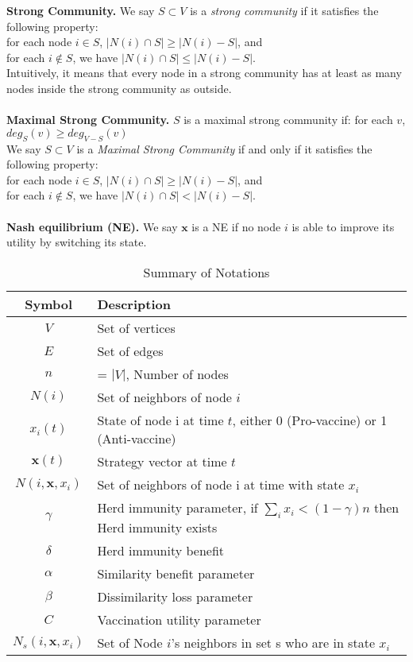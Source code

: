 \noindent
\textbf{Strong Community.} We say $S\subset V$ is a \emph{strong community} if it satisfies the following property:
\\
for each node $i\in S$, $|N(i)\cap S| \geq |N(i)-S|$, and
\\
for each $i\not\in S$, we have $|N(i)\cap S| \leq |N(i)-S|$.
\\
Intuitively, it means that every node in a strong community has at least as many nodes inside the strong community as outside.
\\
\\
\noindent
\textbf{Maximal Strong Community.} $S$ is a maximal strong community if: for each $v$, $deg_S(v)\geq deg_{V-S}(v)$
\\
We say $S\subset V$ is a \emph{Maximal Strong Community} if and only if it satisfies the following property:
\\
for each node $i\in S$, $|N(i)\cap S| \geq |N(i)-S|$, and
\\
for each $i\not\in S$, we have $|N(i)\cap S| < |N(i)-S|$.
\\
\\
\noindent
\textbf{Nash equilibrium (NE).}
We say $\mathbf{x}$ is a NE if no node $i$ is able to improve its utility by switching its state.



\begin{table}[H]
\centering
\caption{Summary of Notations}
\label{table:notations}
\begingroup
\setlength{\tabcolsep}{4pt}
\renewcommand{\arraystretch}{1.35}
\begin{tabular}{|c|l|}
\hline
Symbol          & Description                                 \\ \hline
$V$             & Set of vertices \\ \hline
$E$             & Set of edges\\ \hline
$n$   & = $|V|$, Number of nodes \\ \hline
$N(i)$       & Set of neighbors of node $i$ \\ \hline
$x_i(t)$       & State of node i at time $t$, either 0 (Pro-vaccine) or 1 (Anti-vaccine) \\ \hline
$\mathbf{x}(t)$     & Strategy vector at time $t$\\ \hline
$N(i, \mathbf{x}, x_i)$     & Set of neighbors of node i at time with state $x_i$\\ \hline
$\gamma$ & Herd immunity parameter, if $\sum_i x_i < (1- \gamma) n$ then Herd immunity exists\\ \hline
$\delta$         & Herd immunity benefit\\ \hline
$\alpha$         & Similarity benefit parameter\\ \hline
$\beta$   & Dissimilarity loss parameter\\ \hline
$C$      & Vaccination utility parameter\\ \hline
$N_s(i, \mathbf{x}, x_i)$      & Set of Node $i$'s neighbors in set s who are in state $x_i$\\ \hline
\end{tabular}
\endgroup
\end{table}